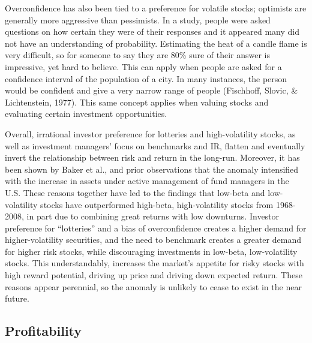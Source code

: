 \documentclass[12pt,twoside]{reedthesis}
\theoremstyle{definition}
\theoremstyle{definition}
\theoremstyle{definition}
\theoremstyle{remark}
\begin{document}
Overconfidence has also been tied to a preference for volatile stocks;
optimists are generally more aggressive than pessimists. In a study,
people were asked questions on how certain they were of their responses
and it appeared many did not have an understanding of probability.
Estimating the heat of a candle flame is very difficult, so for someone
to say they are 80\% sure of their answer is impressive, yet hard to
believe. This can apply when people are asked for a confidence interval
of the population of a city. In many instances, the person would be
confident and give a very narrow range of people (Fischhoff, Slovic, \&
Lichtenstein, 1977). This same concept applies when valuing stocks and
evaluating certain investment opportunities.

Overall, irrational investor preference for lotteries and
high-volatility stocks, as well as investment managers' focus on
benchmarks and IR, flatten and eventually invert the relationship
between risk and return in the long-run. Moreover, it has been shown by
Baker et al., and prior observations that the anomaly intensified with
the increase in assets under active management of fund managers in the
U.S. These reasons together have led to the findings that low-beta and
low-volatility stocks have outperformed high-beta, high-volatility
stocks from 1968-2008, in part due to combining great returns with low
downturns. Investor preference for ``lotteries'' and a bias of
overconfidence creates a higher demand for higher-volatility securities,
and the need to benchmark creates a greater demand for higher risk
stocks, while discouraging investments in low-beta, low-volatility
stocks. This understandably, increases the market's appetite for risky
stocks with high reward potential, driving up price and driving down
expected return. These reasons appear perennial, so the anomaly is
unlikely to cease to exist in the near future.

\subsection{Profitability}\label{profitability}
\end{document}
